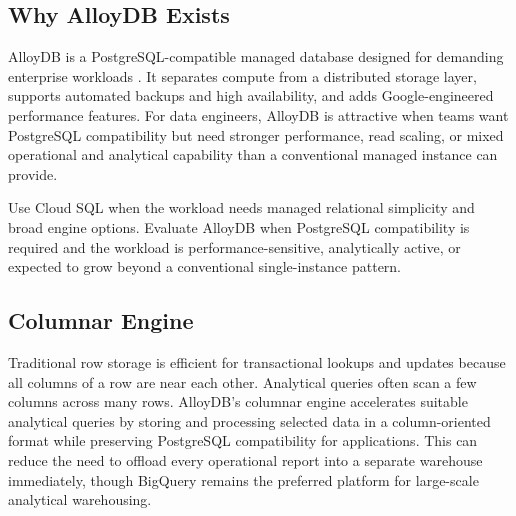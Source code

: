\subsection{Why AlloyDB Exists}
AlloyDB is a PostgreSQL-compatible managed database designed for demanding enterprise workloads \cite{googlecloudalloydbdocs}. It separates compute from a distributed storage layer, supports automated backups and high availability, and adds Google-engineered performance features. For data engineers, AlloyDB is attractive when teams want PostgreSQL compatibility but need stronger performance, read scaling, or mixed operational and analytical capability than a conventional managed instance can provide.

\begin{tipbox}
Use Cloud SQL when the workload needs managed relational simplicity and broad engine options. Evaluate AlloyDB when PostgreSQL compatibility is required and the workload is performance-sensitive, analytically active, or expected to grow beyond a conventional single-instance pattern.
\end{tipbox}

\subsection{Columnar Engine}
Traditional row storage is efficient for transactional lookups and updates because all columns of a row are near each other. Analytical queries often scan a few columns across many rows. AlloyDB's columnar engine accelerates suitable analytical queries by storing and processing selected data in a column-oriented format while preserving PostgreSQL compatibility for applications. This can reduce the need to offload every operational report into a separate warehouse immediately, though BigQuery remains the preferred platform for large-scale analytical warehousing.

